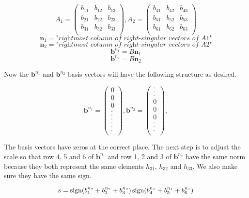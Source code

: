 \[
A_1 = 
\begin{pmatrix}
b_{11} & b_{12} & b_{13} \\
b_{21} & b_{22} & b_{23} \\
b_{31} & b_{32} & b_{33} \\
\end{pmatrix},
A_2 = 
\begin{pmatrix}
b_{41} & b_{42} & b_{43} \\
b_{51} & b_{52} & b_{53} \\
b_{61} & b_{62} & b_{63} \\
\end{pmatrix}
\]
\[
\textbf{n}_1 = \textit{"rightmost column of right-singular vectors of A1"}
\]
\[
\textbf{n}_2 = \textit{"rightmost column of right-singular vectors of A2"}
\]
\[
\textbf{b}^{n_1} = B\textbf{n}_1
\]
\[
\textbf{b}^{n_2} = B\textbf{n}_2
\]

Now the $\textbf{b}^{n_1}$ and $\textbf{b}^{n_2}$ basis vectors will have the following structure as desired.

\[
\textbf{b}^{n_1} =
\begin{pmatrix}
0 \\
0 \\
0 \\
. \\
. \\
. \\
. \\
. \\
. \\
\end{pmatrix},
\textbf{b}^{n_2} =
\begin{pmatrix}
. \\
. \\
. \\
0 \\
0 \\
0 \\
. \\
. \\
. \\
\end{pmatrix},
\]

The basis vectors have zeros at the correct place. The next step is to adjust the scale so that row 4, 5 and 6 of $\textbf{b}^{n_1}$ and row 1, 2 and 3 of $\textbf{b}^{n_2}$ have the same norm because they both represent the same elements $h_{31}$, $h_{32}$ and $h_{33}$. We also make sure they have the same sign.

\[
s = \operatorname{sign}(b^{n_2}_1 + b^{n_2}_2 + b^{n_2}_3) \operatorname{sign}(b^{n_1}_4 + b^{n_1}_5 + b^{n_1}_6)
\]

